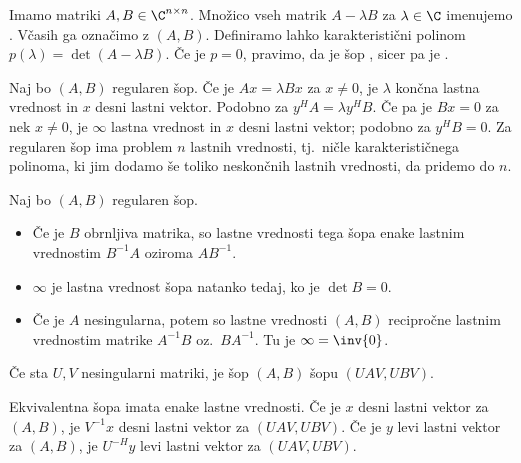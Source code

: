 

Imamo matriki $A, B \in \C^{n \times n}$.
Množico vseh matrik $A - \lambda B$ za $\lambda \in \C$ imenujemo
.
Včasih ga označimo z $(A,B)$.
Definiramo lahko karakteristični polinom $p(\lambda) = \det (A - \lambda B)$.
Če je $p = 0$, pravimo, da je šop , sicer pa je
.

Naj bo $(A,B)$ regularen šop.
Če je $A x = \lambda B x$ za $x \ne 0$, je $\lambda$ končna lastna vrednost in
$x$ desni lastni vektor.
Podobno za $y^H A = \lambda y^H B$.
Če pa je $B x = 0$ za nek $x \ne 0$, je $\infty$ lastna vrednost in $x$ desni
lastni vektor; podobno za $y^H B = 0$.
Za regularen šop ima problem $n$ lastnih vrednosti, tj.~ničle karakterističnega
polinoma, ki jim dodamo še toliko neskončnih lastnih vrednosti, da pridemo do
$n$.


\begin{izrek}
  Naj bo $(A,B)$ regularen šop.
  \begin{itemize}
  \item Če je $B$ obrnljiva matrika, so lastne vrednosti tega šopa enake lastnim
	vrednostim $B^{-1} A$ oziroma $A B^{-1}$.
  \item $\infty$ je lastna vrednost šopa natanko tedaj, ko je $\det B = 0$.
  \item Če je $A$ nesingularna, potem so lastne vrednosti $(A,B)$ recipročne
	lastnim vrednostim matrike $A^{-1} B$ oz.~$B A^{-1}$.
	Tu je $\infty = \inv{0}$.
  \end{itemize}
\end{izrek}


\begin{definicija}
  Če sta $U, V$ nesingularni matriki, je šop $(A,B)$  šopu
  $(UAV, UBV)$.
\end{definicija}

\begin{izrek}
  Ekvivalentna šopa imata enake lastne vrednosti.
  Če je $x$ desni lastni vektor za $(A,B)$, je $V^{-1}x$ desni lastni vektor za
  $(UAV, UBV)$.
  Če je $y$ levi lastni vektor za $(A,B)$, je $U^{-H} y$ levi lastni vektor za
  $(UAV, UBV)$.
\end{izrek}

